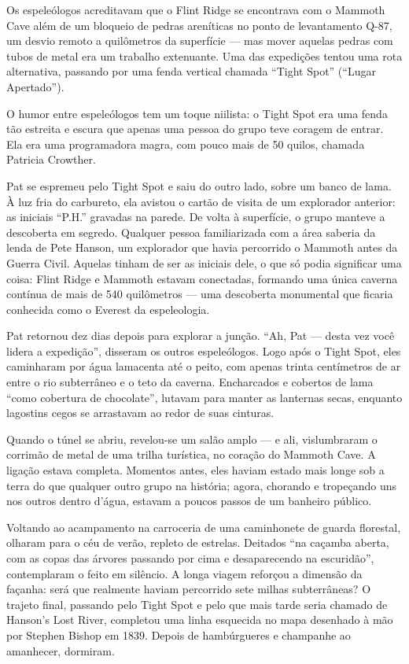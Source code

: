 \documentclass[12pt,a4paper]{article}
\begin{document}
Os espeleólogos acreditavam que o Flint Ridge se encontrava com o Mammoth Cave além de um bloqueio de pedras areníticas no ponto de levantamento Q-87, um desvio remoto a quilômetros da superfície — mas mover aquelas pedras com tubos de metal era um trabalho extenuante.
Uma das expedições tentou uma rota alternativa, passando por uma fenda vertical chamada “Tight Spot” (“Lugar Apertado”).

O humor entre espeleólogos tem um toque niilista: o Tight Spot era uma fenda tão estreita e escura que apenas uma pessoa do grupo teve coragem de entrar.
Ela era uma programadora magra, com pouco mais de 50 quilos, chamada Patricia Crowther.

Pat se espremeu pelo Tight Spot e saiu do outro lado, sobre um banco de lama. À luz fria do carbureto, ela avistou o cartão de visita de um explorador anterior: as iniciais “P.H.” gravadas na parede.
De volta à superfície, o grupo manteve a descoberta em segredo.
Qualquer pessoa familiarizada com a área saberia da lenda de Pete Hanson, um explorador que havia percorrido o Mammoth antes da Guerra Civil.
Aquelas tinham de ser as iniciais dele, o que só podia significar uma coisa: Flint Ridge e Mammoth estavam conectadas, formando uma única caverna contínua de mais de 540 quilômetros — uma descoberta monumental que ficaria conhecida como o Everest da espeleologia.

Pat retornou dez dias depois para explorar a junção.
“Ah, Pat — desta vez você lidera a expedição”, disseram os outros espeleólogos.
Logo após o Tight Spot, eles caminharam por água lamacenta até o peito, com apenas trinta centímetros de ar entre o rio subterrâneo e o teto da caverna.
Encharcados e cobertos de lama “como cobertura de chocolate”, lutavam para manter as lanternas secas, enquanto lagostins cegos se arrastavam ao redor de suas cinturas.

Quando o túnel se abriu, revelou-se um salão amplo — e ali, vislumbraram o corrimão de metal de uma trilha turística, no coração do Mammoth Cave.
A ligação estava completa.
Momentos antes, eles haviam estado mais longe sob a terra do que qualquer outro grupo na história; agora, chorando e tropeçando uns nos outros dentro d’água, estavam a poucos passos de um banheiro público.

Voltando ao acampamento na carroceria de uma caminhonete de guarda florestal, olharam para o céu de verão, repleto de estrelas.
Deitados “na caçamba aberta, com as copas das árvores passando por cima e desaparecendo na escuridão”, contemplaram o feito em silêncio.
A longa viagem reforçou a dimensão da façanha: será que realmente haviam percorrido sete milhas subterrâneas?
O trajeto final, passando pelo Tight Spot e pelo que mais tarde seria chamado de Hanson’s Lost River, completou uma linha esquecida no mapa desenhado à mão por Stephen Bishop em 1839.
Depois de hambúrgueres e champanhe ao amanhecer, dormiram.
\end{document}
